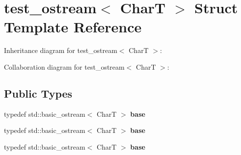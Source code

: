 \hypertarget{structtest__ostream}{}\section{test\+\_\+ostream$<$ CharT $>$ Struct Template Reference}
\label{structtest__ostream}


Inheritance diagram for test\+\_\+ostream$<$ CharT $>$\+:


Collaboration diagram for test\+\_\+ostream$<$ CharT $>$\+:
\subsection*{Public Types}
\begin{DoxyCompactItemize}
\item 
\mbox{\label{structtest__ostream_aa3cb9062bda2f153ab7ea4dc8fbad4c2}} 
typedef std\+::basic\+\_\+ostream$<$ CharT $>$ {\bfseries base}
\item 
\mbox{\label{structtest__ostream_aa3cb9062bda2f153ab7ea4dc8fbad4c2}} 
typedef std\+::basic\+\_\+ostream$<$ CharT $>$ {\bfseries base}
\item 
\mbox{\label{structtest__ostream_aa3cb9062bda2f153ab7ea4dc8fbad4c2}} 
typedef std\+::basic\+\_\+ostream$<$ CharT $>$ {\bfseries base}
\end{DoxyCompactItemize}
